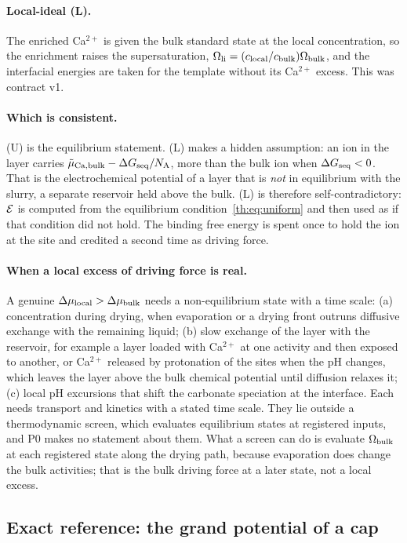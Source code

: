 \paragraph{Local-ideal (L).} The enriched Ca$^{2+}$ is given the bulk standard state at the local
concentration, so the enrichment raises the supersaturation, $\Omega_\mathrm{li}=(c_\mathrm{local}/c_\mathrm{bulk})\Omega_\mathrm{bulk}$, and
the interfacial energies are taken for the template without its Ca$^{2+}$ excess. This was
contract v1.

\paragraph{Which is consistent.} (U) is the equilibrium statement. (L) makes a hidden
assumption: an ion in the layer carries $\tilde\mu_\mathrm{Ca,bulk}-\Delta G_\mathrm{seq}/N_\mathrm{A}$, more than the bulk
ion when $\Delta G_\mathrm{seq}<0$. That is the electrochemical potential of a layer that is \emph{not} in
equilibrium with the slurry, a separate reservoir held above the bulk. (L) is therefore
self-contradictory: $\mathcal{E}$ is computed from the equilibrium condition~\eqref{th:eq:uniform} and
then used as if that condition did not hold. The binding free energy is spent once to hold the ion
at the site and credited a second time as driving force.

\paragraph{When a local excess of driving force is real.} A genuine $\Delta\mu_\mathrm{local}>\Delta\mu_\mathrm{bulk}$
needs a non-equilibrium state with a time scale: (a) concentration during drying, when
evaporation or a drying front outruns diffusive exchange with the remaining liquid; (b) slow
exchange of the layer with the reservoir, for example a layer loaded with Ca$^{2+}$ at one
activity and then exposed to another, or Ca$^{2+}$ released by protonation of the sites when the
pH changes, which leaves the layer above the bulk chemical potential until diffusion relaxes it;
(c) local pH excursions that shift the carbonate speciation at the interface. Each needs
transport and kinetics with a stated time scale. They lie outside a thermodynamic screen, which
evaluates equilibrium states at registered inputs, and P0 makes no statement about them. What a
screen can do is evaluate $\Omega_\mathrm{bulk}$ at each registered state along the drying path, because
evaporation does change the bulk activities; that is the bulk driving force at a later state, not
a local excess.

\subsection{Exact reference: the grand potential of a cap}

